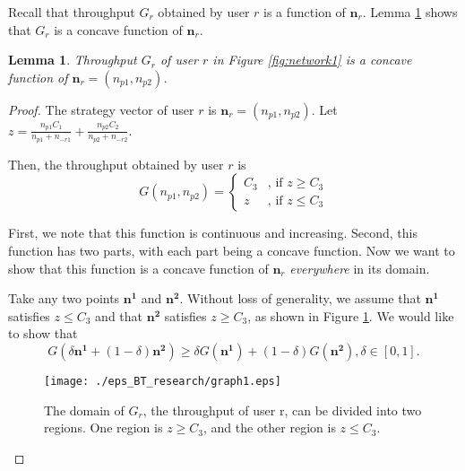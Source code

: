 \documentclass[conference]{IEEEtran}
\newtheorem{lemma}{Lemma}
\begin{document}
Recall that throughput $G_r$ obtained by user $r$ is a function of
$\mathbf{n}_r$. Lemma \ref{lem:lem1} shows that $G_r$ is a concave
function of $\mathbf{n}_r$.


\begin{lemma}
Throughput $G_r$ of user $r$ in Figure \ref{fig:network1} is a
concave function of
$\mathbf{n}_r=(n_{p1}, n_{p2})$. \label{lem:lem1}
\end{lemma}


\begin{proof}
The strategy vector of user $r$ is $\mathbf{n}_r=(n_{p1},
n_{p2})$. Let $z=\frac{n_{p1} C_1}{n_{p1} + n_{-r1}} +
\frac{n_{p2} C_2}{n_{p2}+n_{-r2}}$.

Then, the throughput obtained by user $r$ is
\begin{equation}
G(n_{p1},n_{p2}) = \left \{ \begin{array}{ll}
C_3 & \textrm{, if $z \ge C_3$} \\
z & \textrm{, if $z \le C_3$}
\end{array} \right.
\end{equation}


First, we note that this function is continuous and increasing.
Second, this function has two parts, with each part being a
concave function. Now we want to show that this function is a
concave function of $\mathbf{n}_r$ \textit{everywhere} in its
domain.

Take any two points $\mathbf{n^1}$ and $\mathbf{n^2}$. Without
loss of generality, we assume that $\mathbf{n^1}$ satisfies $z \le
C_3$ and that $\mathbf{n^2}$ satisfies $z \ge C_3$, as shown in
Figure \ref{fig:two.regions}. We would like to show that
$$
G(\delta \mathbf{n^1} + (1-\delta) \mathbf{n^2}) \ge \delta
G(\mathbf{n^1})+ (1-\delta) G(\mathbf{n^2}), \delta \in [0,1].
$$

\begin{figure}[htb!]
    \begin{center}
    \texttt{[image: ./eps\_BT\_research/graph1.eps]}
    \caption{The domain of $G_r$,
    the throughput of user r, can be divided into two regions.
    One region is $z\ge C_3$, and the other region is $z\le C_3$.}
    \label{fig:two.regions}
    \end{center}
\end{figure}




\end{proof}
\end{document}
